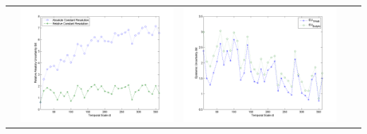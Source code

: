 \documentclass[11pt]{article}
\begin{document}
\begin{table}[H]
{\begin{tabular}{c  c   c   c  c }
&\begin{minipage}{.4\textwidth}\includegraphics[width=\linewidth]{resultgraph/05585000AU.png}\end{minipage}
&\begin{minipage}{.4\textwidth}\includegraphics[width=\linewidth]{resultgraph/05585000EU.png}\end{minipage}
\\

\end{tabular}}
\end{table}
\end{document}
